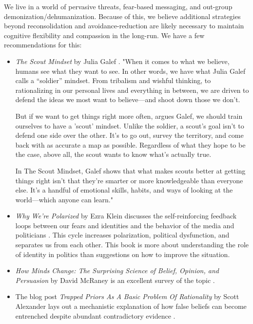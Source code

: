 \documentclass[12pt,letterpaper]{book}
\begin{document}
We live in a world of pervasive threats, fear-based messaging, and out-group demonization/dehumanization. Because of this, we believe additional strategies beyond reconsolidation and avoidance-reduction are likely necessary to maintain cognitive flexibility and compassion in the long-run. We have a few recommendations for this:
\begin{itemize}
    \item \textit{The Scout Mindset} by Julia Galef \cite{galefScoutMindset}. "When it comes to what we believe, humans see what they want to see. In other words, we have what Julia Galef calls a “soldier” mindset. From tribalism and wishful thinking, to rationalizing in our personal lives and everything in between, we are driven to defend the ideas we most want to believe—and shoot down those we don't.

    But if we want to get things right more often, argues Galef, we should train ourselves to have a 'scout' mindset. Unlike the soldier, a scout's goal isn't to defend one side over the other. It's to go out, survey the territory, and come back with as accurate a map as possible. Regardless of what they hope to be the case, above all, the scout wants to know what's actually true.
    
    In The Scout Mindset, Galef shows that what makes scouts better at getting things right isn't that they're smarter or more knowledgeable than everyone else. It's a handful of emotional skills, habits, and ways of looking at the world—which anyone can learn."
    \item \textit{Why We're Polarized} by Ezra Klein discusses the self-reinforcing feedback loops between our fears and identities and the behavior of the media and politicians \cite{klein2020Polarized}. This cycle increases polarization, political dysfunction, and separates us from each other. This book is more about understanding the role of identity in politics than suggestions on how to improve the situation.
    \item \textit{How Minds Change: The Surprising Science of Belief, Opinion, and Persuasion} by David McRaney is an excellent survey of the topic \cite{mcraneyMinds}.
    \item The blog post \textit{Trapped Priors As A Basic Problem Of Rationality} by Scott Alexander lays out a mechanistic explanation of how false beliefs can become entrenched despite abundant contradictory evidence \cite{alexanderTrapped}.
\end{itemize}
\label{sec:glossary}
\printglossaries
{}
\appendix
\end{document}
